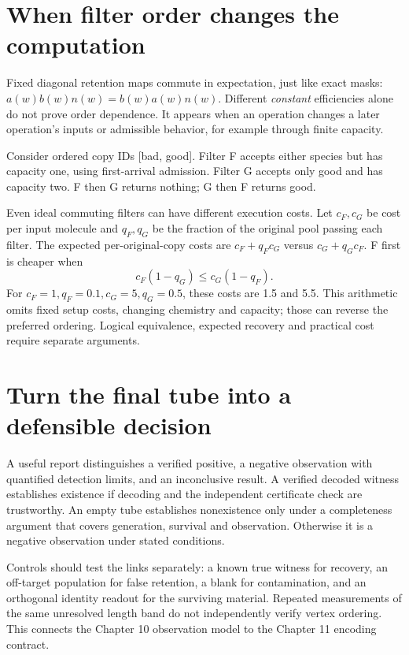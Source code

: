 \section{When filter order changes the computation}
Fixed diagonal retention maps commute in expectation, just like exact masks:
$a(w)b(w)n(w)=b(w)a(w)n(w)$. Different \emph{constant} efficiencies alone
do not prove order dependence. It appears when an operation changes a later
operation's inputs or admissible behavior, for example through finite capacity.

Consider ordered copy IDs [bad, good]. Filter F accepts either species but
has capacity one, using first-arrival admission. Filter G accepts only good
and has capacity two. F then G returns nothing; G then F returns good.

Even ideal commuting filters can have different execution costs. Let
$c_F,c_G$ be cost per input molecule and $q_F,q_G$ be the fraction of the
original pool passing each filter. The expected per-original-copy costs are
$c_F+q_Fc_G$ versus $c_G+q_Gc_F$. F first is cheaper when
\begin{equation}
 c_F(1-q_G)\le c_G(1-q_F).
\end{equation}
For $c_F=1,q_F=0.1,c_G=5,q_G=0.5$, these costs are 1.5 and 5.5.
This arithmetic omits fixed setup costs, changing chemistry and capacity;
those can reverse the preferred ordering. Logical equivalence, expected
recovery and practical cost require separate arguments.

\section{Turn the final tube into a defensible decision}
A useful report distinguishes a verified positive, a negative observation
with quantified detection limits, and an inconclusive result. A verified
decoded witness establishes existence if decoding and the independent
certificate check are trustworthy. An empty tube establishes nonexistence
only under a completeness argument that covers generation, survival and
observation. Otherwise it is a negative observation under stated conditions.

Controls should test the links separately: a known true witness for recovery,
an off-target population for false retention, a blank for contamination,
and an orthogonal identity readout for the surviving material. Repeated
measurements of the same unresolved length band do not independently verify
vertex ordering. This connects the Chapter 10 observation model to the
Chapter 11 encoding contract.


